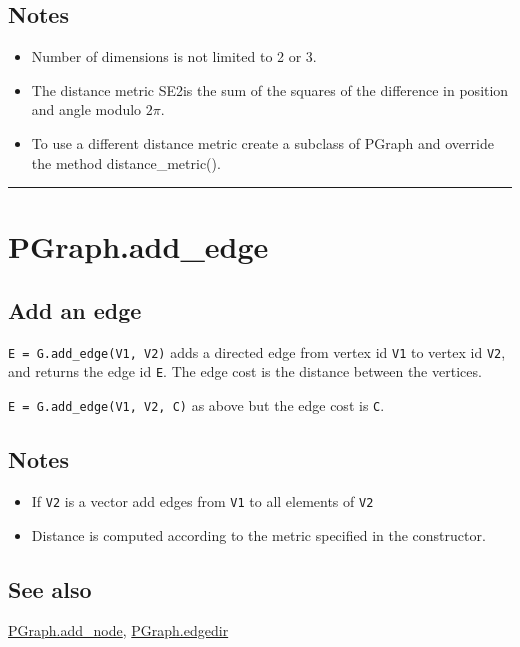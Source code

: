 \subsection*{Notes}
\begin{itemize}
  \item Number of dimensions is not limited to 2 or 3.
  \item The distance metric \textquotesingle SE2\textquotesingle  is the sum of the squares of the difference    in position and angle modulo $2\pi$.
  \item To use a different distance metric create a subclass of PGraph and    override the method distance\_metric().
\end{itemize}
\vspace{1.5ex}\hrule

\hypertarget{PGraph.add\_edge}{\section*{PGraph.add\_edge}}
\subsection*{Add an edge}


\texttt{E = G.add\_edge(V1, V2)} adds a directed edge from vertex id \texttt{V1} to vertex id \texttt{V2}, and
returns the edge id \texttt{E}.  The edge cost is the distance between the vertices.



\texttt{E = G.add\_edge(V1, V2, C)} as above but the edge cost is \texttt{C}.


\subsection*{Notes}
\begin{itemize}
  \item If \texttt{V2} is a vector add edges from \texttt{V1} to all elements of \texttt{V2}
  \item Distance is computed according to the metric specified in the    constructor.
\end{itemize}

\subsection*{See also}


\hyperlink{PGraph.add_node}{\color{blue} PGraph.add\_node}, \hyperlink{PGraph.edgedir}{\color{blue} PGraph.edgedir}


